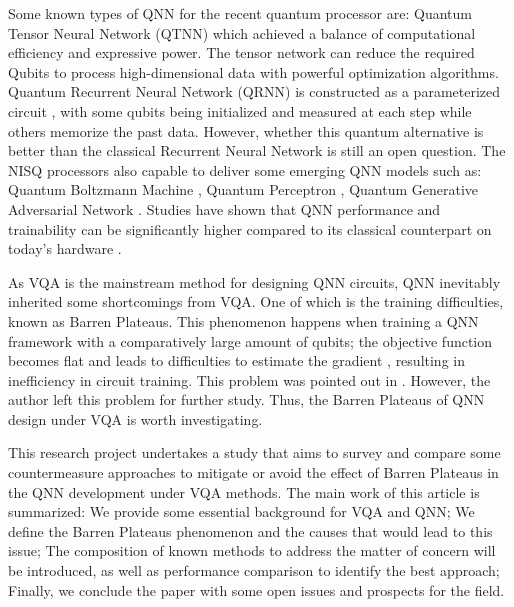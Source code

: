 Some known types of QNN for the recent quantum processor are: 
Quantum Tensor Neural Network (QTNN) \cite{hugginsQuantumMachineLearning2019} which achieved a balance of computational efficiency and expressive power. 
The tensor network can reduce the required Qubits to process high-dimensional data with powerful optimization algorithms.
Quantum Recurrent Neural Network (QRNN) is constructed as a parameterized circuit \cite{takakiLearningTemporalData2021}, with some qubits being initialized and measured at each step while others memorize the past data.
However, whether this quantum alternative is better than the classical Recurrent Neural Network is still an open question.
The NISQ processors also capable to deliver some emerging QNN models such as: 
Quantum Boltzmann Machine \cite{shinguBoltzmannMachineLearning2021}\cite{zoufalVariationalQuantumBoltzmann2021}, 
Quantum Perceptron \cite{kristensenArtificialSpikingQuantum2021}, 
Quantum Generative Adversarial Network \cite{dallaire-demersQuantumGenerativeAdversarial2018}\cite{lloydQuantumGenerativeAdversarial2018}. Studies have shown that QNN performance and trainability can be significantly higher compared to its classical counterpart on today's hardware \cite{abbasPowerQuantumNeural2021, colesSeekingQuantumAdvantage2021}.

As VQA is the mainstream method for designing QNN circuits, QNN inevitably inherited some shortcomings from VQA.
One of which is the training difficulties, known as Barren Plateaus.
This phenomenon happens when training a QNN framework with a comparatively large amount of qubits; the objective function becomes flat and leads to difficulties to estimate the gradient \cite{mccleanBarrenPlateausQuantum2018, zhaoAnalyzingBarrenPlateau2021}, resulting in inefficiency in circuit training. 
This problem was pointed out in \cite{abbasPowerQuantumNeural2021}. 
However, the author left this problem for further study. 
Thus, the Barren Plateaus of QNN design under VQA is worth investigating.

This research project undertakes a study that aims to survey and compare some countermeasure approaches to mitigate or avoid the effect of Barren Plateaus in the QNN development under VQA methods. 
The main work of this article is summarized: 
We provide some essential background for VQA and QNN;
We define the Barren Plateaus phenomenon and the causes that would lead to this issue; 
The composition of known methods to address the matter of concern will be introduced, as well as performance comparison to identify the best approach; 
Finally, we conclude the paper with some open issues and prospects for the field.


